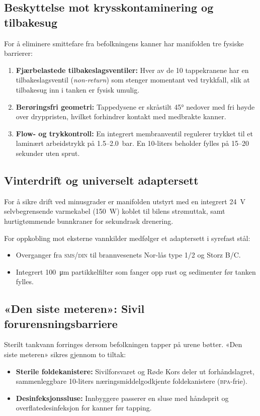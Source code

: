 \subsection{Beskyttelse mot krysskontaminering og tilbakesug}
For å eliminere smittefare fra befolkningens kanner har manifolden tre fysiske barrierer:
\begin{enumerate}[leftmargin=1.5em, itemsep=0.15em]
    \item \textbf{Fjærbelastede tilbakeslagsventiler:} Hver av de 10 tappekranene har en tilbakeslagsventil (\textit{non-return}) som stenger momentant ved trykkfall, slik at tilbakesug inn i tanken er fysisk umulig.
    \item \textbf{Berøringsfri geometri:} Tappedysene er skråstilt \ang{45} nedover med fri høyde over dryppristen, hvilket forhindrer kontakt med medbrakte kanner.
    \item \textbf{Flow- og trykkontroll:} En integrert membranventil regulerer trykket til et laminært arbeidstrykk på \num{1.5}--\SI{2.0}{\bar}. En 10-liters beholder fylles på 15--20 sekunder uten sprut.
\end{enumerate}

\subsection{Vinterdrift og universelt adaptersett}
For å sikre drift ved minusgrader er manifolden utstyrt med en integrert \SI{24}{\volt} selvbegrensende varmekabel (\SI{150}{\watt}) koblet til bilens strømuttak, samt hurtigtømmende bunnkraner for sekundrask drenering.

For oppkobling mot eksterne vannkilder medfølger et adaptersett i syrefast stål:
\begin{itemize}[leftmargin=1.5em, itemsep=0.2em]
    \item Overganger fra \textsc{sms}/\textsc{din} til brannvesenets Nor-lås type 1/2 og Storz B/C.
    \item Integrert \SI{100}{\micro\meter} partikkelfilter som fanger opp rust og sedimenter før tanken fylles.
\end{itemize}

\subsection{«Den siste meteren»: Sivil forurensningsbarriere}
Sterilt tankvann forringes dersom befolkningen tapper på urene bøtter. «Den siste meteren» sikres gjennom to tiltak:
\begin{itemize}[leftmargin=1.5em, itemsep=0.2em]
    \item \textbf{Sterile foldekanistere:} Sivilforsvaret og Røde Kors deler ut forhåndslagret, sammenleggbare 10-liters næringsmiddelgodkjente foldekanistere (\textsc{bpa}-frie).
    \item \textbf{Desinfeksjonssluse:} Innbyggere passerer en sluse med håndsprit og overflatedesinfeksjon for kanner før tapping.
\end{itemize}

